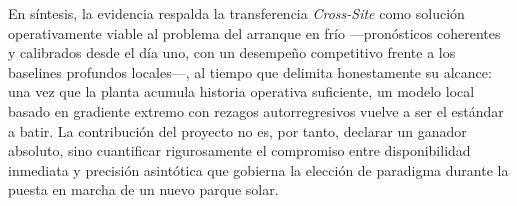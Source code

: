 En síntesis, la evidencia respalda la transferencia \textit{Cross-Site} como solución operativamente viable al problema del arranque en frío —pronósticos coherentes y calibrados desde el día uno, con un desempeño competitivo frente a los baselines profundos locales—, al tiempo que delimita honestamente su alcance: una vez que la planta acumula historia operativa suficiente, un modelo local basado en gradiente extremo con rezagos autorregresivos vuelve a ser el estándar a batir. La contribución del proyecto no es, por tanto, declarar un ganador absoluto, sino cuantificar rigurosamente el compromiso entre disponibilidad inmediata y precisión asintótica que gobierna la elección de paradigma durante la puesta en marcha de un nuevo parque solar.
